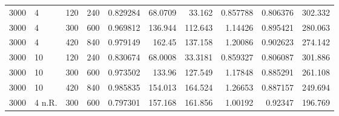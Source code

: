 \begin{tabular}{rlrrrrrrrr}
       3000 & 4          &            120 &             240 &              0.829284 &                 68.0709 &               33.162    &          0.857788 &            0.806376 &            302.332 \\
       3000 & 4          &            300 &             600 &              0.969812 &                136.944  &              112.643    &          1.14426  &            0.895421 &            280.063 \\
       3000 & 4          &            420 &             840 &              0.979149 &                162.45   &              137.158    &          1.20086  &            0.902623 &            274.142 \\
       3000 & 10         &            120 &             240 &              0.830674 &                 68.0008 &               33.3181   &          0.859327 &            0.806087 &            301.886 \\
       3000 & 10         &            300 &             600 &              0.973502 &                133.96   &              127.549    &          1.17848  &            0.885291 &            261.108 \\
       3000 & 10         &            420 &             840 &              0.985835 &                154.013  &              164.524    &          1.26653  &            0.887157 &            249.694 \\
       3000 & 4 n.R.     &            300 &             600 &              0.797301 &                157.168  &              161.856    &          1.00192  &            0.92347  &            196.769 \\
\hline
\end{tabular}
